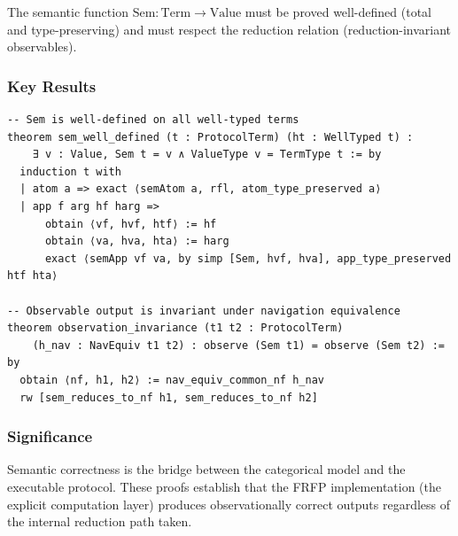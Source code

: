 The semantic function $\mathrm{Sem} : \mathrm{Term} \to \mathrm{Value}$ must
be proved well-defined (total and type-preserving) and must respect the reduction
relation (reduction-invariant observables).

\subsubsection*{Key Results}

\begin{lstlisting}
-- Sem is well-defined on all well-typed terms
theorem sem_well_defined (t : ProtocolTerm) (ht : WellTyped t) :
    ∃ v : Value, Sem t = v ∧ ValueType v = TermType t := by
  induction t with
  | atom a => exact ⟨semAtom a, rfl, atom_type_preserved a⟩
  | app f arg hf harg =>
      obtain ⟨vf, hvf, htf⟩ := hf
      obtain ⟨va, hva, hta⟩ := harg
      exact ⟨semApp vf va, by simp [Sem, hvf, hva], app_type_preserved htf hta⟩

-- Observable output is invariant under navigation equivalence
theorem observation_invariance (t1 t2 : ProtocolTerm)
    (h_nav : NavEquiv t1 t2) : observe (Sem t1) = observe (Sem t2) := by
  obtain ⟨nf, h1, h2⟩ := nav_equiv_common_nf h_nav
  rw [sem_reduces_to_nf h1, sem_reduces_to_nf h2]
\end{lstlisting}

\subsubsection*{Significance}

Semantic correctness is the bridge between the categorical model and the
executable protocol. These proofs establish that the FRFP implementation (the
explicit computation layer) produces observationally correct outputs regardless
of the internal reduction path taken.
